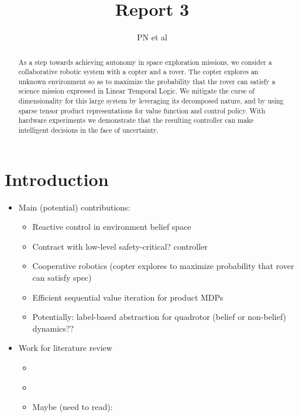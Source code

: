 \documentclass[conference]{IEEEtran}
\begin{document}
\title{\huge Report 3 }

\author{PN et al}

\maketitle

\begin{abstract}
  As a step towards achieving autonomy in space exploration missions, we consider a collaborative robotic system with a copter and a rover. The copter explores an unknown environment so as to maximize the probability that the rover can satisfy a science mission expressed in Linear Temporal Logic. We mitigate the curse of dimensionality for this large system by leveraging its decomposed nature, and by using sparse tensor product representations for value function and control policy. With hardware experiments we demonstrate that the resulting controller can make intelligent decisions in the face of uncertainty.
\end{abstract}

\IEEEpeerreviewmaketitle

	

\section{Introduction}

\begin{itemize}
  \item Main (potential) contributions:
  \begin{itemize}
    \item Reactive control in environment belief space
    \item Contract with low-level safety-critical? controller
    \item Cooperative robotics (copter explores to maximize probability that rover can satisfy spec)
    \item Efficient sequential value iteration for product MDPs
    \item Potentially: label-based abstraction for quadrotor (belief or non-belief) dynamics?? 
  \end{itemize}
\end{itemize}

\begin{itemize}
  \item Work for literature review
  \begin{itemize}
    \item \cite{Papusha2016}
    \item \cite{Alora2016}
    \item Maybe (need to read): \cite{Lavaei2017}
  \end{itemize}
\end{itemize}
\end{document}

